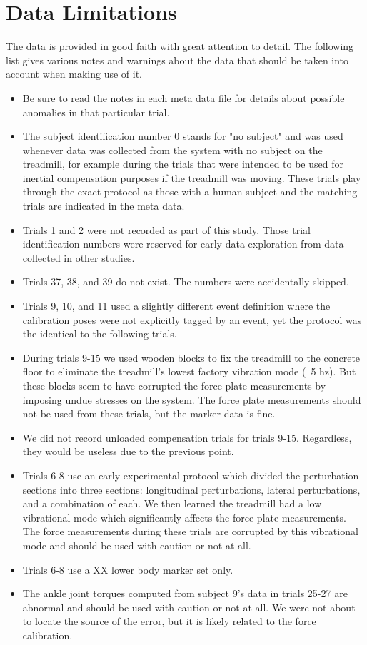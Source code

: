 \documentclass[10pt,a4paper,twocolumn]{article}
\begin{document}
\section*{Data Limitations}
%
The data is provided in good faith with great attention to detail. The
following list gives various notes and warnings about the data that should be
taken into account when making use of it.
%
\begin{itemize}
  \item Be sure to read the notes in each meta data file for details about
    possible anomalies in that particular trial.
  \item The subject identification number 0 stands for "no subject" and was
    used whenever data was collected from the system with no subject on the
    treadmill, for example during the trials that were intended to be used for
    inertial compensation purposes if the treadmill was moving. These trials
    play through the exact protocol as those with a human subject and the
    matching trials are indicated in the meta data.
  \item Trials 1 and 2 were not recorded as part of this study. Those trial
    identification numbers were reserved for early data exploration from data
    collected in other studies.
  \item Trials 37, 38, and 39 do not exist. The numbers were accidentally
    skipped.
  \item Trials 9, 10, and 11 used a slightly different event definition where the
    calibration poses were not explicitly tagged by an event, yet the protocol
    was the identical to the following trials.
  \item During trials 9-15 we used wooden blocks to fix the treadmill to the
    concrete floor to eliminate the treadmill's lowest factory vibration mode
    (~5 hz). But these blocks seem to have corrupted the force plate
    measurements by imposing undue stresses on the system. The force plate
    measurements should not be used from these trials, but the marker data is
    fine.
  \item We did not record unloaded compensation trials for trials 9-15.
    Regardless, they would be useless due to the previous point.
  \item Trials 6-8 use an early experimental protocol which divided the
    perturbation sections into three sections: longitudinal perturbations,
    lateral perturbations, and a combination of each. We then learned the
    treadmill had a low vibrational mode which significantly affects the force
    plate measurements. The force measurements during these trials are
    corrupted by this vibrational mode and should be used with caution or not
    at all.
  \item Trials 6-8 use a XX lower body marker set only.
  \item The ankle joint torques computed from subject 9's data in trials 25-27
    are abnormal and should be used with caution or not at all. We were not
    about to locate the source of the error, but it is likely related to the
    force calibration.
\end{itemize}
\end{document}

